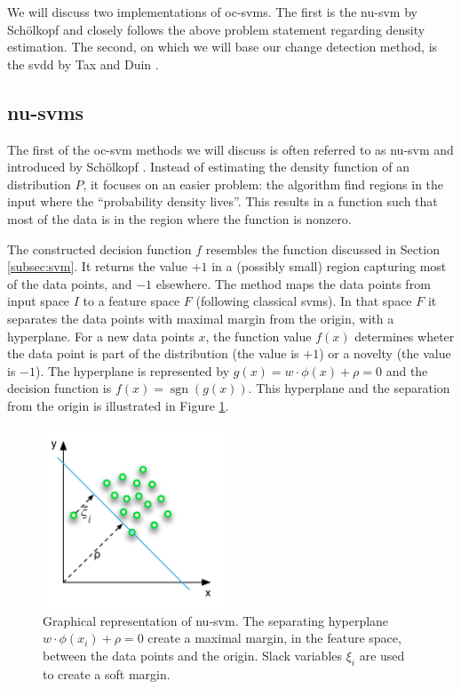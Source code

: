 We will discuss two implementations of \gls{oc-svm}s.
The first is the \gls{nu-svm} by Sch\"olkopf \etal \cite{scholkopf1999support} and closely follows the above problem statement regarding density estimation.
The second, on which we will base our change detection method, is the \gls{svdd} by Tax and Duin \cite{tax2004support}.


\subsection{\acrlong{nu-svm}s}\label{subsec:nu-svm}
The first of the \gls{oc-svm} methods we will discuss is often referred to as \gls{nu-svm} and introduced by Sch\"olkopf \etal \cite{scholkopf1999support}.
Instead of estimating the density function of an distribution $P$, it focuses on an easier problem: the algorithm find regions in the input where the ``probability density lives''.
This results in a function such that most of the data is in the region where the function is nonzero.

The constructed decision function $f$ resembles the function discussed in Section \ref{subsec:svm}.
It returns the value $+1$ in a (possibly small) region capturing most of the data points, and $-1$ elsewhere.
The method maps the data points from input space $I$ to a feature space $F$ (following classical \gls{svm}s).
In that space $F$ it separates the data points with maximal margin from the origin, with a hyperplane.
For a new data points $x$, the function value $f(x)$ determines wheter the data point is part of the distribution (\ie the value is $+1$) or a novelty (\ie the value is $-1$).
The hyperplane is represented by $g(x) = w \cdot \phi(x) + \rho = 0$ and the decision function is $f(x) = \operatorname{sgn}(g(x))$.
This hyperplane and the separation from the origin is illustrated in Figure \ref{fig:nu-svm}.

\begin{figure}
  \centering
    \includegraphics[width=0.5\textwidth,keepaspectratio]{./Figures/chapter3/nu-svm.pdf}
  \caption[\gls{nu-svm}]{Graphical representation of \gls{nu-svm}. The separating hyperplane $w \cdot \phi(x_i) + \rho = 0$ create a maximal margin, in the feature space, between the data points and the origin. Slack variables $\xi_i$ are used to create a soft margin.}
  \label{fig:nu-svm}
\end{figure}

